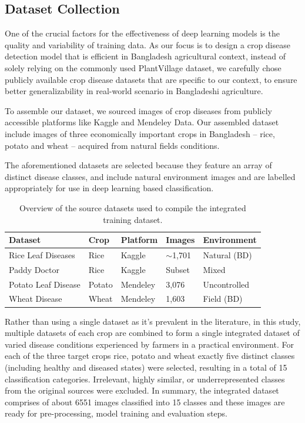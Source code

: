 \subsection{Dataset Collection}

One of the crucial factors for the effectiveness of deep learning models is the quality and variability of training data. As our focus is to design a crop disease detection model that is efficient in Bangladesh agricultural context, instead of solely relying on the commonly used PlantVillage dataset, we carefully chose publicly available crop disease datasets that are specific to our context, to ensure better generalizability in real-world scenario in Bangladeshi agriculture.

To assemble our dataset, we sourced images of crop diseases from publicly accessible platforms like Kaggle and Mendeley Data. Our assembled dataset include images of three economically important crops in Bangladesh – rice, potato and wheat – acquired from natural fields conditions.

The aforementioned datasets are selected because they feature an array of distinct disease classes, and include natural environment images and are labelled appropriately for use in deep learning based classification.

\begin{table}[H]
\centering
\begin{tabular}{|l|l|l|l|l|} 
\hline
\textbf{Dataset} & \textbf{Crop} & \textbf{Platform} & \textbf{Images} & \textbf{Environment} \\ \hline
Rice Leaf Diseases & Rice & Kaggle & $\sim$1,701 & Natural (BD) \\ \hline
Paddy Doctor & Rice & Kaggle & Subset & Mixed \\ \hline
Potato Leaf Disease & Potato & Mendeley & 3,076 & Uncontrolled \\ \hline
Wheat Disease & Wheat & Mendeley & 1,603 & Field (BD) \\ \hline
\end{tabular}
\caption{Overview of the source datasets used to compile the integrated training dataset.}
\label{tab:dataset_sources}
\end{table}


Rather than using a single dataset as it’s prevalent in the literature, in this study, multiple datasets of each crop are combined to form a single integrated dataset of varied disease conditions experienced by farmers in a practical environment. For each of the three target crops rice, potato and wheat exactly five distinct classes (including healthy and diseased states) were selected, resulting in a total of 15 classification categories. Irrelevant, highly similar, or underrepresented classes from the original sources were excluded. In summary, the integrated dataset comprises of about 6551 images classified into 15 classes and these images are ready for pre-processing, model training and evaluation steps.


